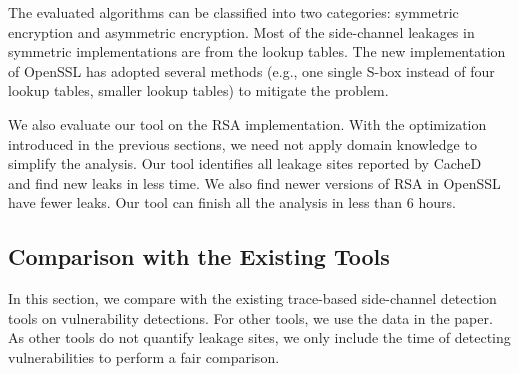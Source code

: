 The evaluated algorithms can be classified into two categories: symmetric
encryption and asymmetric encryption. Most of the side-channel leakages in symmetric implementations are from the lookup tables. The new implementation of OpenSSL has adopted several methods (e.g., one single S-box instead of four lookup tables, smaller lookup tables) to mitigate the problem. 

We also evaluate our tool on the RSA implementation. With the optimization
introduced in the previous sections, we need not apply domain knowledge to
simplify the analysis. Our tool identifies all leakage sites
reported by CacheD~\cite{203878} and find new leaks in less time.
We also find newer versions of RSA in OpenSSL have fewer leaks. Our tool can
finish all the analysis in less than 6 hours. 

\subsection{Comparison with the Existing Tools}
\label{eval:scala}

In this section, we compare \tool{} with the
existing trace-based side-channel detection tools on vulnerability detections. For other tools, we use the data in the paper. As other tools do not quantify leakage sites, we only include the time of detecting vulnerabilities to perform a fair comparison.

